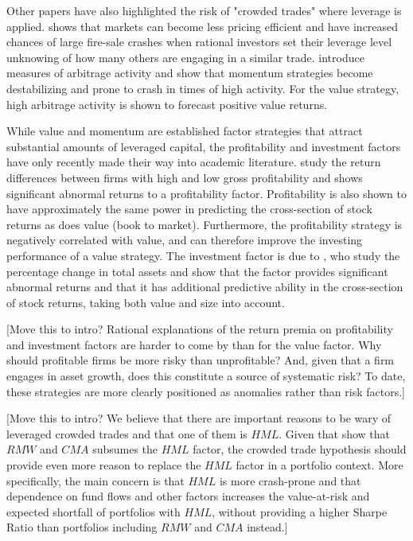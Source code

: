 Other papers have also highlighted the risk of "crowded trades" where leverage is applied. \textcite{Stein2009} shows that markets can become less pricing efficient and have increased chances of large fire-sale crashes when rational investors set their leverage level unknowing of how many others are engaging in a similar trade. \textcite{LouPolk2013} introduce measures of arbitrage activity and show that momentum strategies become destabilizing and prone to crash in times of high activity. For the value strategy, high arbitrage activity is shown to forecast positive value returns.

While value and momentum are established factor strategies that attract substantial amounts of leveraged capital, the profitability and investment factors have only recently made their way into academic literature. \textcite{NovyMarx2013} study the return differences between firms with high and low gross profitability and shows significant abnormal returns to a profitability factor. Profitability is also shown to have approximately the same power in predicting the cross-section of stock returns as does value (book to market). Furthermore, the profitability strategy is negatively correlated with value, and can therefore improve the investing performance of a value strategy. The investment factor is due to \textcite{CooperGulenSchill2008}, who study the percentage change in total assets and show that the factor provides significant abnormal returns and that it has additional predictive ability in the cross-section of stock returns, taking both value and size into account.

[Move this to intro? Rational explanations of the return premia on profitability and investment factors are harder to come by than for the value factor. Why should profitable firms be more risky than unprofitable? And, given that a firm engages in asset growth, does this constitute a source of systematic risk? To date, these strategies are more clearly positioned as anomalies rather than risk factors.]

[Move this to intro? We believe that there are important reasons to be wary of leveraged crowded trades and that one of them is $HML$. Given that \textcite{FF2015} show that $RMW$ and $CMA$ subsumes the $HML$ factor, the crowded trade hypothesis should provide even more reason to replace the $HML$ factor in a portfolio context. More specifically, the main concern is that $HML$ is more crash-prone and that dependence on fund flows and other factors increases the value-at-risk and expected shortfall of portfolios with $HML$, without providing a higher Sharpe Ratio than portfolios including $RMW$ and $CMA$ instead.]
